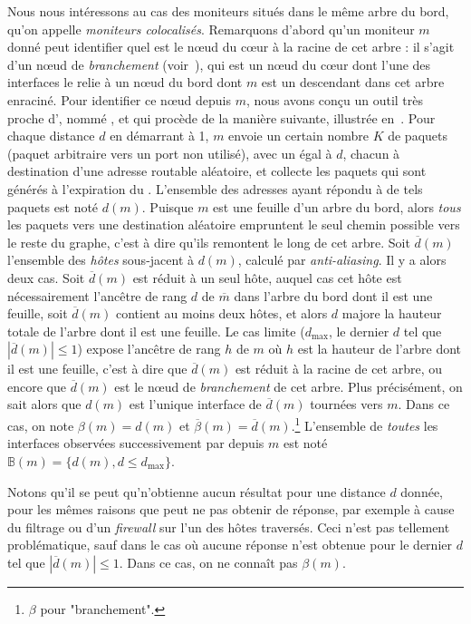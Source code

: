 Nous nous intéressons au cas des moniteurs situés dans le même arbre du bord,
qu'on appelle {\em moniteurs colocalisés}. Remarquons d'abord qu'un moniteur $m$
donné peut identifier quel est le n\oe{}ud du c\oe{}ur à la racine de cet arbre
:
il s'agit d'un n\oe{}ud de {\em branchement} (voir~),
qui est un n\oe{}ud du c\oe{}ur dont l'une des interfaces le relie à un n\oe{}ud
du bord dont $m$ est un descendant dans cet arbre enraciné. Pour identifier ce
n\oe{}ud depuis $m$, nous avons conçu un outil très proche d'\udpping, nommé
\udpexplore, et qui procède de la manière suivante, illustrée
en~.
Pour chaque distance $d$ en démarrant à 1, $m$ envoie un certain nombre $K$ de
paquets \udpping (paquet \udp arbitraire vers un port non utilisé), avec un \ttl
égal à $d$, chacun à destination d'une adresse routable aléatoire, et collecte
les paquets  qui sont générés à l'expiration du \ttl.
L'ensemble des adresses ayant répondu à de tels paquets est noté $d(m)$. Puisque
$m$ est une feuille d'un arbre du bord, alors {\em tous} les paquets vers une
destination aléatoire empruntent le seul chemin possible vers le reste du
graphe, c'est à dire qu'ils remontent le long de cet arbre. Soit
$\overline{d}(m)$ l'ensemble des {\em hôtes} sous-jacent à $d(m)$, calculé par
{\em anti-aliasing}. Il y a alors deux cas. Soit $\overline{d}(m)$ est réduit à
un seul hôte, auquel cas cet hôte est nécessairement l'ancêtre de rang $d$ de
$\overline{m}$ dans l'arbre du bord dont il est une feuille, soit
$\overline{d}(m)$ contient au moins deux hôtes, et alors $d$ majore la hauteur
totale de l'arbre dont il est une feuille. Le cas limite ($d_{\max}$, le dernier
$d$ tel que $|\overline{d}(m)| \leq 1$) expose l'ancêtre de rang $h$ de $m$ où
$h$ est la hauteur de l'arbre dont il est une feuille, c'est à dire que
$\overline{d}(m)$ est réduit à la racine de cet arbre, ou encore que
$\overline{d}(m)$ est le n\oe{}ud de {\em branchement} de cet arbre. Plus
précisément, on sait alors que $d(m)$ est l'unique interface de
$\overline{d}(m)$ tournées vers $m$. Dans ce cas, on note $\beta(m) = d(m)$ et
$\overline{\beta}(m) = \overline{d}(m)$.\footnote{$\beta$ pour "branchement".}
L'ensemble de {\em toutes} les interfaces observées successivement par \udpping
depuis $m$ est noté ${\mathbb B}(m) = \{ d(m), d \leq d_{\max} \}$.

Notons qu'il se peut qu'\udpexplore n'obtienne aucun résultat pour une distance
$d$ donnée, pour les mêmes raisons que \udpping peut ne pas obtenir de réponse,
par exemple à cause du filtrage \icmp ou d'un {\em firewall} sur l'un des hôtes
traversés. Ceci n'est pas tellement problématique, sauf dans le cas où aucune
réponse n'est obtenue pour le dernier $d$ tel que $|\overline{d}(m)| \leq 1$.
Dans ce cas, on ne connaît pas $\beta(m)$.

